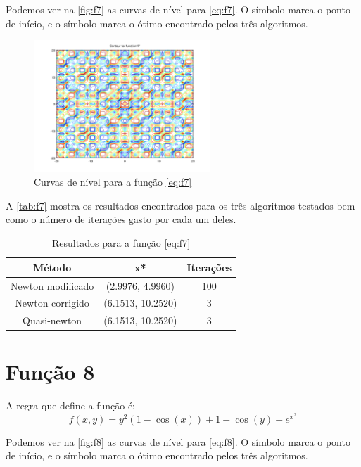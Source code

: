 \documentclass[12pt]{article}
\begin{document}
Podemos ver na \autoref{fig:f7} as curvas de nível para \autoref{eq:f7}. O símbolo \textit{\textopenbullet} marca o ponto de início,
e o símbolo \textit{\texttimes} marca o ótimo encontrado pelos três algoritmos.

\begin{figure}[H]
  \centering
  \includegraphics[width=250px]{../matlab/images/f7_contour}
  \caption{Curvas de nível para a função \autoref{eq:f7}}
  \label{fig:f7}
\end{figure}

A \autoref{tab:f7} mostra os resultados encontrados para os três algoritmos testados bem como o número de iterações gasto por cada um deles.

\begin{table}[H]
\centering
\begin{tabular}{*3c}
\toprule
Método			&	x*		&	Iterações\\
\midrule
Newton modificado	&	(2.9976, 4.9960)	&	100\\
Newton corrigido	&	(6.1513, 10.2520)	&	3\\
Quasi-newton		&	(6.1513, 10.2520)	&	3\\
\bottomrule
\end{tabular}
\caption{\small{Resultados para a função \autoref{eq:f7} }}
\label{tab:f7}
\end{table}


\section{Função 8}
A regra que define a função é:
\begin{equation}
\label{eq:f8}
f(x, y) = y^2(1-\cos(x)) + 1 -\cos(y) + e^{x^2}
\end{equation}

Podemos ver na \autoref{fig:f8} as curvas de nível para \autoref{eq:f8}. O símbolo \textit{\textopenbullet} marca o ponto de início,
e o símbolo \textit{\texttimes} marca o ótimo encontrado pelos três algoritmos.
\end{document}
